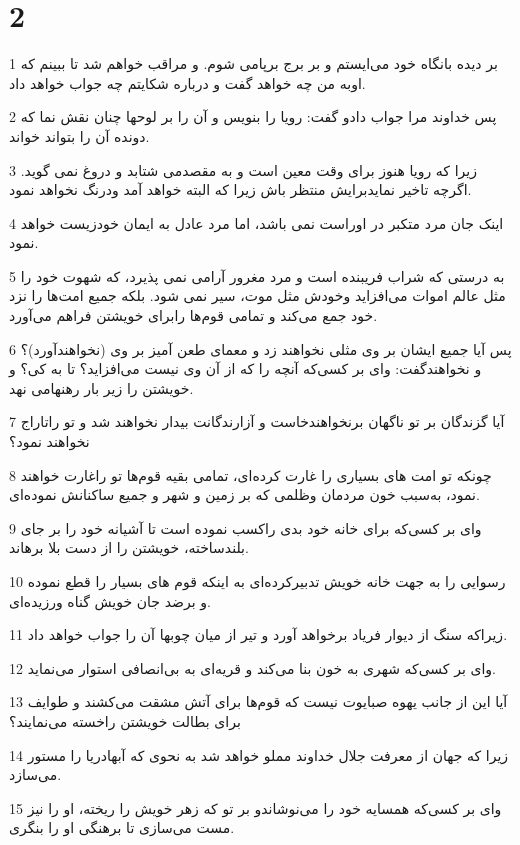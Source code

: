 \chapter{2}

\par 1 بر دیده بانگاه خود می‌ایستم و بر برج برپامی شوم. و مراقب خواهم شد تا ببینم که اوبه من چه خواهد گفت و درباره شکایتم چه جواب خواهد داد.
\par 2 پس خداوند مرا جواب دادو گفت: رویا را بنویس و آن را بر لوحها چنان نقش نما که دونده آن را بتواند خواند.
\par 3 زیرا که رویا هنوز برای وقت معین است و به مقصدمی شتابد و دروغ نمی گوید. اگر‌چه تاخیر نمایدبرایش منتظر باش زیرا که البته خواهد آمد ودرنگ نخواهد نمود.
\par 4 اینک جان مرد متکبر در اوراست نمی باشد، اما مرد عادل به ایمان خودزیست خواهد نمود.
\par 5 به درستی که شراب فریبنده است و مرد مغرور آرامی نمی پذیرد، که شهوت خود را مثل عالم اموات می‌افزاید وخودش مثل موت، سیر نمی شود. بلکه جمیع امت‌ها را نزد خود جمع می‌کند و تمامی قوم‌ها رابرای خویشتن فراهم می‌آورد.
\par 6 پس آیا جمیع ایشان بر وی مثلی نخواهند زد و معمای طعن آمیز بر وی (نخواهند‌آورد)؟ و نخواهندگفت: وای بر کسی‌که آنچه را که از آن وی نیست می‌افزاید؟ تا به کی؟ و خویشتن را زیر بار رهنهامی نهد.
\par 7 آیا گزندگان بر تو ناگهان برنخواهندخاست و آزارندگانت بیدار نخواهند شد و تو راتاراج نخواهند نمود؟
\par 8 چونکه تو امت های بسیاری را غارت کرده‌ای، تمامی بقیه قوم‌ها تو راغارت خواهند نمود، به‌سبب خون مردمان وظلمی که بر زمین و شهر و جمیع ساکنانش نموده‌ای.
\par 9 وای بر کسی‌که برای خانه خود بدی راکسب نموده است تا آشیانه خود را بر جای بلندساخته، خویشتن را از دست بلا برهاند.
\par 10 رسوایی را به جهت خانه خویش تدبیرکرده‌ای به اینکه قوم های بسیار را قطع نموده و برضد جان خویش گناه ورزیده‌ای.
\par 11 زیراکه سنگ از دیوار فریاد برخواهد آورد و تیر از میان چوبها آن را جواب خواهد داد.
\par 12 وای بر کسی‌که شهری به خون بنا می‌کند و قریه‌ای به بی‌انصافی استوار می‌نماید.
\par 13 آیا این از جانب یهوه صبایوت نیست که قوم‌ها برای آتش مشقت می‌کشند و طوایف برای بطالت خویشتن راخسته می‌نمایند؟
\par 14 زیرا که جهان از معرفت جلال خداوند مملو خواهد شد به نحوی که آبهادریا را مستور می‌سازد.
\par 15 وای بر کسی‌که همسایه خود را می‌نوشاندو بر تو که زهر خویش را ریخته، او را نیز مست می‌سازی تا برهنگی او را بنگری.
